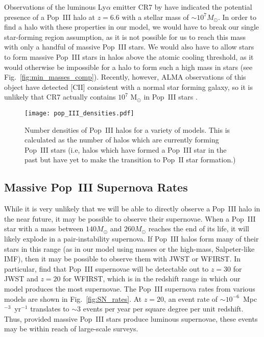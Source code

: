 \documentclass[a4paper,fleqn,usenatbib]{mnras}
\begin{document}
Observations of the luminous Ly$\alpha$ emitter CR7 by \citet{sobral_2015} have indicated the potential presence of a Pop~III halo at $z=6.6$ with a stellar mass of $\sim 10^7 M_\odot$. In order to find a halo with these properties in our model, we would have to break our single star-forming region assumption, as it is not possible for us to reach this mass with only a handful of massive Pop~III stars. We would also have to allow stars to form massive Pop~III stars in halos above the atomic cooling threshold, as it would otherwise be impossible for a halo to form such a high mass in stars (see Fig.~\ref{fig:min_masses_comp}). Recently, however, ALMA observations of this object have detected [CII] consistent with a normal star forming galaxy, so it is unlikely that CR7 actually contains $10^7$ M$_\odot$ in Pop~III stars \citep{matthee_2017}.

\begin{figure}
	\texttt{[image: pop\_III\_densities.pdf]}
    \caption{Number densities of Pop~III halos for a variety of models. This is calculated as the number of halos which are currently forming Pop~III stars (i.e, halos which have formed a Pop~III star in the past but have yet to make the transition to Pop~II star formation.)}
    \label{fig:pop_III_densities}
\end{figure}

\subsection{
Massive Pop~III Supernova Rates}
\label{sec:SN_observe}

While it is very unlikely that we will be able to directly observe a Pop~III halo in the near future, it may be possible to observe their supernovae. When a Pop~III star with a mass between $140 M_\odot$ and $260 M_\odot$ reaches the end of its life, it will likely explode in a pair-instability supernova. If Pop~III halos form many of their stars in this range (as in our model using 
\citealt{mckee_2008} masses or the high-mass, Salpeter-like IMF), then it may be possible to observe them with JWST or WFIRST. In particular, \citet{whalen_2013} find that Pop~III supernovae will be 
detectable out to $z=30$ for JWST and $z=20$ for WFIRST, which is in the redshift range in which our model 
produces the most supernovae. The Pop~III supernova rates from various models are shown in Fig.~\ref{fig:SN_rates}.
At $z=20$, an event rate of $\sim 10^{-6}$~Mpc$^{-3}$~yr$^{-1}$ translates to $\sim 3$ events per year per square degree per unit redshift. Thus, provided massive Pop~III stars produce luminous supernovae, these events may be
within reach of large-scale surveys.
\end{document}
